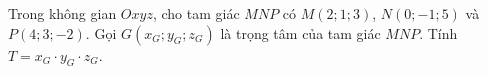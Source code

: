 \begin{ex}
Trong không gian $Oxyz$, cho tam giác $MNP$ có $M(2;1;3)$, $N(0;-1;5)$ và $P(4;3;-2)$. Gọi $G(x_G;y_G;z_G)$ là trọng tâm của tam giác $MNP$. Tính $T=x_G\cdot y_G\cdot z_G$.
\end{ex}
